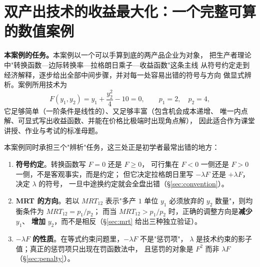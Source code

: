 

\chapter{双产出技术的收益最大化：一个完整可算的数值案例}

\noindent\textbf{本案例的任务。}本案例以一个可以手算到底的两产品企业为对象，
把生产者理论中"转换函数—边际转换率—拉格朗日乘子—收益函数"这条主线
从符号约定走到经济解释，逐步给出全部中间步骤，并对每一处容易出错的符号与方向
做显式辨析。案例所用技术为
\begin{equation*}
F(y_1,y_2)=y_1+\frac{y_2^{2}}{4}-10=0,
\qquad p_1=2,\quad p_2=4,
\end{equation*}
它足够简单（一阶条件是线性的）、又足够丰富（包含机会成本递增、
唯一内点解、可显式写出收益函数、并能在价格比极端时出现角点解），
因此适合作为课堂讲授、作业与考试的标准母题。

\noindent 本案例同时承担三个"辨析"任务，这三处正是初学者最常出错的地方：

\begin{enumerate}
  \item \textbf{符号约定}。转换函数写 $F=0$ 还是 $F\ge 0$，
        可行集在 $F<0$ 一侧还是 $F>0$ 一侧，不是客观事实，而是约定；
        但它决定拉格朗日里写 $-\lambda F$ 还是 $+\lambda F$，决定 $\lambda$ 的符号，
        一旦中途换约定就会全盘出错（\S\ref{sec:convention}）。
  \item \textbf{MRT 的方向}。若以 $MRT_{12}$ 表示"多产 $1$ 单位 $y_1$
        必须放弃的 $y_2$ 数量"，则均衡条件为 $MRT_{12}=p_1/p_2$；
        而当 $MRT_{12}>p_1/p_2$ 时，正确的调整方向是\textbf{减少} $y_1$、
        \textbf{增加} $y_2$，而不是相反（\S\ref{sec:mrt} 给出三种独立验证）。
  \item \textbf{$-\lambda F$ 的性质}。在等式约束问题里，$-\lambda F$ 不是"惩罚项"，
        $\lambda$ 是技术约束的影子值；真正的惩罚项只出现在罚函数法中，
        且惩罚的对象是 $F^{2}$ 而非 $\lambda F$（\S\ref{sec:penalty}）。
\end{enumerate}

\tableofcontents
\clearpage







